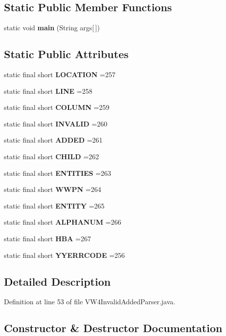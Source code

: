 \subsection*{Static Public Member Functions}
\begin{DoxyCompactItemize}
\item 
static void {\bf main} (String args[$\,$])
\end{DoxyCompactItemize}
\subsection*{Static Public Attributes}
\begin{DoxyCompactItemize}
\item 
static final short {\bf L\+O\+C\+A\+T\+I\+O\+N} =257
\item 
static final short {\bf L\+I\+N\+E} =258
\item 
static final short {\bf C\+O\+L\+U\+M\+N} =259
\item 
static final short {\bf I\+N\+V\+A\+L\+I\+D} =260
\item 
static final short {\bf A\+D\+D\+E\+D} =261
\item 
static final short {\bf C\+H\+I\+L\+D} =262
\item 
static final short {\bf E\+N\+T\+I\+T\+I\+E\+S} =263
\item 
static final short {\bf W\+W\+P\+N} =264
\item 
static final short {\bf E\+N\+T\+I\+T\+Y} =265
\item 
static final short {\bf A\+L\+P\+H\+A\+N\+U\+M} =266
\item 
static final short {\bf H\+B\+A} =267
\item 
static final short {\bf Y\+Y\+E\+R\+R\+C\+O\+D\+E} =256
\end{DoxyCompactItemize}


\subsection{Detailed Description}


Definition at line 53 of file V\+W4\+Invalid\+Added\+Parser.\+java.



\subsection{Constructor \& Destructor Documentation}
